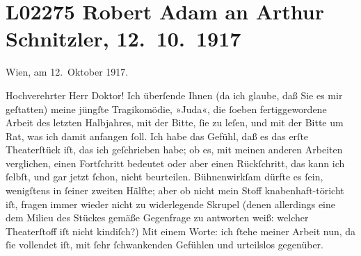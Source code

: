 

\section[Robert Adam an Arthur Schnitzler, 12. 10. 1917]{L02275 Robert Adam an Arthur Schnitzler, 12. 10. 1917}
\nopagebreak{}
\rehead{ }\normalsize\beginnumbering{}
\toendnotes[C]{\smallbreak\pagebreak[2]}
\toendnotes[C]{\smallbreak}
\pstart
           \raggedleft{}{\pb}Wien, am 12. Oktober 1917.\pend
           
\pstart{}Hochverehrter Herr Doktor!\pend\vspace{0.5em}
\pstart
           Ich überſende Ihnen (da ich glaube, daß Sie es mir geſtatten) meine jüngſte
               Tragikomödie, »Juda«, die{ }ſoeben fertiggewordene
               Arbeit des letzten Halbjahres, mit der Bitte,{ }ſie zu leſen, und mit der Bitte um Rat,
               was ich damit anfangen{ }ſoll. Ich habe das Gefühl, daß es das erſte Theaterſtück iſt,
               das ich geſchrieben habe; ob es, mit meinen anderen Arbeiten verglichen, einen
               Fortſchritt bedeutet oder aber einen Rückſchritt, das kann ich{ }ſelbſt, und gar jetzt{ }ſchon, nicht beurteilen. Bühnenwirkſam dürfte es{ }ſein, wenigſtens in{ }ſeiner zweiten
               Hälfte; aber ob nicht mein Stoff {\pb}knabenhaft-töricht
               iſt, fragen immer wieder nicht zu widerlegende Skrupel (denen allerdings eine dem
               Milieu des Stückes gemäße Gegenfrage zu antworten weiß: welcher Theaterſtoff iſt
               nicht kindiſch?) Mit einem Worte: ich{ }ſtehe meiner Arbeit nun, da{ }ſie vollendet iſt,
               mit{ }ſehr{ }ſchwankenden Gefühlen und urteilslos gegenüber.\pend
           
